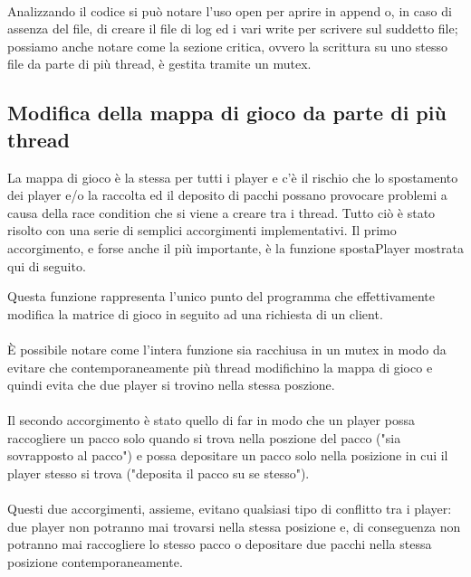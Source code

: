 \documentclass[a4paper]{article}
\begin{document}
\paragraph{}
Analizzando il codice si può notare l'uso open per aprire in append o, in caso di assenza del file, di creare
il file di log ed i vari write per scrivere sul suddetto file; possiamo anche notare come la sezione critica, ovvero 
la scrittura su uno stesso file da parte di più thread, è gestita tramite un mutex.
\subsection{Modifica della mappa di gioco da parte di più thread}
La mappa di gioco è la stessa per tutti i player e c'è il rischio che lo spostamento dei player e/o la raccolta ed il deposito di pacchi possano provocare problemi
a causa della race condition che si viene a creare tra i thread. Tutto ciò è stato risolto con una serie di semplici accorgimenti implementativi.
Il primo accorgimento, e forse anche il più importante, è la funzione spostaPlayer mostrata qui di seguito.

Questa funzione rappresenta l'unico punto del programma che effettivamente modifica la matrice di gioco in seguito ad una richiesta di un client.
\paragraph{}
È possibile notare come l'intera funzione sia racchiusa in un mutex in modo da evitare che contemporaneamente più thread modifichino la mappa di gioco e 
quindi evita che due player si trovino nella stessa poszione.
\paragraph{}Il secondo accorgimento è stato quello di far in modo che un player possa raccogliere un pacco solo quando si trova nella poszione del pacco
("sia sovrapposto al pacco") e possa depositare un pacco solo nella posizione in cui il player stesso si trova ("deposita il pacco su se stesso").
\paragraph{}
Questi due accorgimenti, assieme, evitano qualsiasi tipo di conflitto tra i player: due player non potranno mai trovarsi nella stessa posizione
e, di conseguenza non potranno mai raccogliere lo stesso pacco o depositare due pacchi nella stessa posizione contemporaneamente.
\appendix
\end{document}
